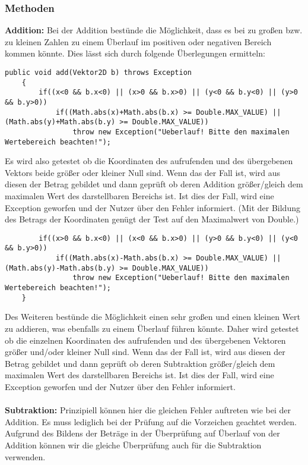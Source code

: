 \documentclass[a4paper,11pt]{scrartcl}
\begin{document}
\subsubsection{Methoden}
\textbf{Addition:}  Bei der Addition bestünde die Möglichkeit, dass es bei zu großen bzw. zu kleinen Zahlen zu einem Überlauf im positiven oder negativen Bereich kommen könnte. Dies lässt sich durch folgende Überlegungen ermitteln:
\begin{lstlisting}
public void add(Vektor2D b) throws Exception
	{
		if((x<0 && b.x<0) || (x>0 && b.x>0) || (y<0 && b.y<0) || (y>0 && b.y>0)) 
			if((Math.abs(x)+Math.abs(b.x) >= Double.MAX_VALUE) || (Math.abs(y)+Math.abs(b.y) >= Double.MAX_VALUE))
				throw new Exception("Ueberlauf! Bitte den maximalen Wertebereich beachten!");
\end{lstlisting}
Es wird also getestet ob die Koordinaten des aufrufenden und des übergebenen Vektors beide größer oder kleiner Null sind. Wenn das der Fall ist, wird aus diesen der Betrag gebildet und dann geprüft ob deren Addition größer/gleich dem maximalen Wert des darstellbaren Bereichs ist. Ist dies der Fall, wird eine Exception geworfen und der Nutzer über den Fehler informiert.
(Mit der Bildung des Betrags der Koordinaten genügt der Test auf den Maximalwert von Double.)
\begin{lstlisting}		
		if((x>0 && b.x<0) || (x<0 && b.x>0) || (y>0 && b.y<0) || (y<0 && b.y>0))
			if((Math.abs(x)-Math.abs(b.x) >= Double.MAX_VALUE) || (Math.abs(y)-Math.abs(b.y) >= Double.MAX_VALUE))
				throw new Exception("Ueberlauf! Bitte den maximalen Wertebereich beachten!");
	}
\end{lstlisting}
Des Weiteren bestünde die Möglichkeit einen sehr großen und einen kleinen Wert zu addieren, was ebenfalls zu einem Überlauf führen könnte. Daher wird getestet ob die einzelnen Koordinaten des aufrufenden und des übergebenen Vektoren größer und/oder kleiner Null sind. Wenn das der Fall ist, wird aus diesen der Betrag gebildet und dann geprüft ob deren Subtraktion größer/gleich dem maximalen Wert des darstellbaren Bereichs ist. Ist dies der Fall, wird eine Exception geworfen und der Nutzer über den Fehler informiert.\\
\\
\textbf{Subtraktion:} Prinzipiell können hier die gleichen Fehler auftreten wie bei der Addition. Es muss lediglich bei der Prüfung auf die Vorzeichen geachtet werden. Aufgrund des Bildens der Beträge in der Überprüfung auf Überlauf von der Addition können wir die gleiche Überprüfung auch für die Subtraktion verwenden.\\
\end{document}
